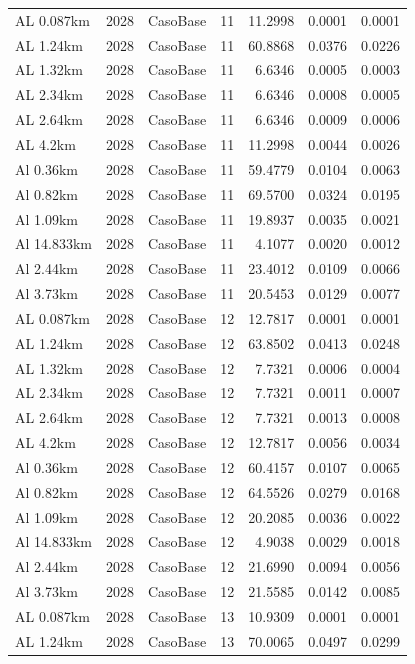\documentclass[11pt,a4paper]{article}
\begin{document}
\begin{longtable}{llllrrr}
AL 0.087km & 2028 & CasoBase & 11 & 11.2998 & 0.0001 & 0.0001 \\
AL 1.24km & 2028 & CasoBase & 11 & 60.8868 & 0.0376 & 0.0226 \\
AL 1.32km & 2028 & CasoBase & 11 & 6.6346 & 0.0005 & 0.0003 \\
AL 2.34km & 2028 & CasoBase & 11 & 6.6346 & 0.0008 & 0.0005 \\
AL 2.64km & 2028 & CasoBase & 11 & 6.6346 & 0.0009 & 0.0006 \\
AL 4.2km & 2028 & CasoBase & 11 & 11.2998 & 0.0044 & 0.0026 \\
Al 0.36km & 2028 & CasoBase & 11 & 59.4779 & 0.0104 & 0.0063 \\
Al 0.82km & 2028 & CasoBase & 11 & 69.5700 & 0.0324 & 0.0195 \\
Al 1.09km & 2028 & CasoBase & 11 & 19.8937 & 0.0035 & 0.0021 \\
Al 14.833km & 2028 & CasoBase & 11 & 4.1077 & 0.0020 & 0.0012 \\
Al 2.44km & 2028 & CasoBase & 11 & 23.4012 & 0.0109 & 0.0066 \\
Al 3.73km & 2028 & CasoBase & 11 & 20.5453 & 0.0129 & 0.0077 \\
AL 0.087km & 2028 & CasoBase & 12 & 12.7817 & 0.0001 & 0.0001 \\
AL 1.24km & 2028 & CasoBase & 12 & 63.8502 & 0.0413 & 0.0248 \\
AL 1.32km & 2028 & CasoBase & 12 & 7.7321 & 0.0006 & 0.0004 \\
AL 2.34km & 2028 & CasoBase & 12 & 7.7321 & 0.0011 & 0.0007 \\
AL 2.64km & 2028 & CasoBase & 12 & 7.7321 & 0.0013 & 0.0008 \\
AL 4.2km & 2028 & CasoBase & 12 & 12.7817 & 0.0056 & 0.0034 \\
Al 0.36km & 2028 & CasoBase & 12 & 60.4157 & 0.0107 & 0.0065 \\
Al 0.82km & 2028 & CasoBase & 12 & 64.5526 & 0.0279 & 0.0168 \\
Al 1.09km & 2028 & CasoBase & 12 & 20.2085 & 0.0036 & 0.0022 \\
Al 14.833km & 2028 & CasoBase & 12 & 4.9038 & 0.0029 & 0.0018 \\
Al 2.44km & 2028 & CasoBase & 12 & 21.6990 & 0.0094 & 0.0056 \\
Al 3.73km & 2028 & CasoBase & 12 & 21.5585 & 0.0142 & 0.0085 \\
AL 0.087km & 2028 & CasoBase & 13 & 10.9309 & 0.0001 & 0.0001 \\
AL 1.24km & 2028 & CasoBase & 13 & 70.0065 & 0.0497 & 0.0299 \\

\end{longtable}
\end{document}
